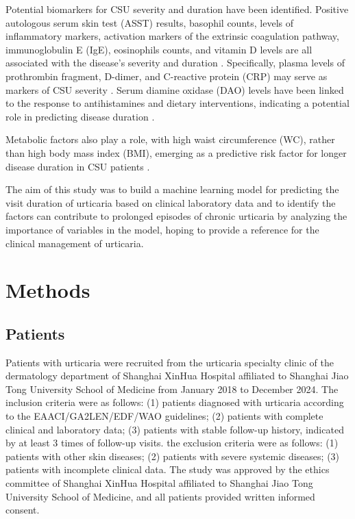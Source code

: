\documentclass[final,3p,times,authoryear]{elsarticle}
\begin{document}
Potential biomarkers for CSU severity and duration have been identified. Positive autologous serum skin test (ASST) results, basophil counts, levels of inflammatory markers, activation markers of the extrinsic coagulation pathway, immunoglobulin E (IgE), eosinophils counts, and vitamin D levels are all associated with the disease's severity and duration \citep{SanchezBorges2017Factors,Rabelo-Filardi2013Parameters, Kolkhir2019Eosinopenia}. Specifically, plasma levels of prothrombin fragment, D-dimer, and C-reactive protein (CRP) may serve as markers of CSU severity \citep{Rabelo-Filardi2013Parameters}. Serum diamine oxidase (DAO) levels have been linked to the response to antihistamines and dietary interventions, indicating a potential role in predicting disease duration \citep{Chiang2022Predictors}.

Metabolic factors also play a role, with high waist circumference (WC), rather than high body mass index (BMI), emerging as a predictive risk factor for longer disease duration in CSU patients \citep{Kim2021High}.

The aim of this study was to build a machine learning model for predicting the visit duration of urticaria based on clinical laboratory data and to identify the factors can contribute to prolonged episodes of chronic urticaria by analyzing the importance of variables in the model, hoping to provide a reference for the clinical management of urticaria.

\section{Methods}\label{Methods}
\subsection{Patients}\label{Patients}

Patients with urticaria were recruited from the urticaria specialty clinic of the dermatology department of Shanghai XinHua Hospital affiliated to Shanghai Jiao Tong University School of Medicine from January 2018 to December 2024. The inclusion criteria were as follows: (1) patients diagnosed with urticaria according to the EAACI/GA2LEN/EDF/WAO guidelines\citep{Zuberbier2021The}; (2) patients with complete clinical and laboratory data; (3) patients with stable follow-up history, indicated by at least 3 times of follow-up visits. the exclusion criteria were as follows: (1) patients with other skin diseases; (2) patients with severe systemic diseases; (3) patients with incomplete clinical data. The study was approved by the ethics committee of Shanghai XinHua Hospital affiliated to Shanghai Jiao Tong University School of Medicine, and all patients provided written informed consent.
\end{document}
